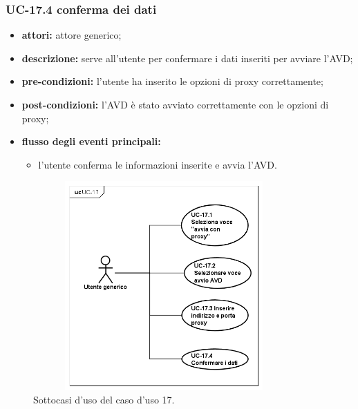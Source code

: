 \subsubsection*{UC-17.4 conferma dei dati}
\begin{itemize}
    \item \textbf{attori:} attore generico;
    \item \textbf{descrizione:} serve all'utente per confermare i dati inseriti per avviare l'AVD;
    \item \textbf{pre-condizioni:} l'utente ha inserito le opzioni di proxy correttamente;
    \item \textbf{post-condizioni:} l'AVD è stato avviato correttamente con le opzioni di proxy;
    \item \textbf{flusso degli eventi principali:}
    \begin{itemize}
        \item l'utente conferma le informazioni inserite e avvia l'AVD.
    \end{itemize}
\end{itemize}

\begin{figure}[H]
    \centering
    \includegraphics[width=10cm, height=8cm]{./immagini/usecase/uc_17.png}
    \caption{Sottocasi d'uso del caso d'uso 17.}
\end{figure}
